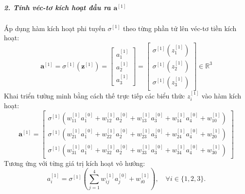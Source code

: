 \subparagraph{2. Tính véc-tơ kích hoạt đầu ra $\mathbf{a}^{[1]}$\\}
Áp dụng hàm kích hoạt phi tuyến $\sigma^{[1]}$ theo từng phần tử lên véc-tơ tiền kích hoạt:
\begin{equation}
    \mathbf{a}^{[1]} = \sigma^{[1]}\left(\mathbf{z}^{[1]}\right) 
    = \begin{bmatrix} a_1^{[1]} \\ a_2^{[1]} \\ a_3^{[1]} \end{bmatrix} 
    = \begin{bmatrix} 
        \sigma^{[1]}\left(z_1^{[1]}\right) \\ 
        \sigma^{[1]}\left(z_2^{[1]}\right) \\ 
        \sigma^{[1]}\left(z_3^{[1]}\right) 
    \end{bmatrix} \in \mathbb{R}^3
\end{equation}
Khai triển tường minh bằng cách thế trực tiếp các biểu thức $z_i^{[1]}$ vào hàm kích hoạt:
\begin{equation}
    \mathbf{a}^{[1]} = \begin{bmatrix} 
        \sigma^{[1]}\left( w_{11}^{[1]} a_1^{[0]} + w_{12}^{[1]} a_2^{[0]} + w_{13}^{[1]} a_3^{[0]} + w_{14}^{[1]} a_4^{[0]} + w_{10}^{[1]} \right) \\
        \sigma^{[1]}\left( w_{21}^{[1]} a_1^{[0]} + w_{22}^{[1]} a_2^{[0]} + w_{23}^{[1]} a_3^{[0]} + w_{24}^{[1]} a_4^{[0]} + w_{20}^{[1]} \right) \\
        \sigma^{[1]}\left( w_{31}^{[1]} a_1^{[0]} + w_{32}^{[1]} a_2^{[0]} + w_{33}^{[1]} a_3^{[0]} + w_{34}^{[1]} a_4^{[0]} + w_{30}^{[1]} \right)
    \end{bmatrix}
\end{equation}
Tương ứng với từng giá trị kích hoạt vô hướng:
\begin{equation}
    a_i^{[1]} = \sigma^{[1]}\left( \sum_{j=1}^{4} w_{ij}^{[1]} a_j^{[0]} + w_{i0}^{[1]} \right), \quad \forall i \in \{1, 2, 3\}.
\end{equation}

